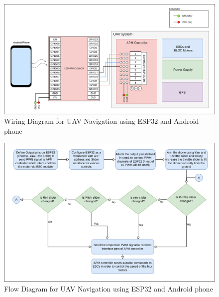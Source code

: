 \begin{figure}[h!]
\centering
\includegraphics[width=\columnwidth]{./Figures/Wiring_UAV_ESP32_commlink.png}
\caption{Wiring Diagram for UAV Navigation using ESP32 and Android phone}
\label{Wiring_UAV_ESP32_commlink}
\end{figure}

\begin{figure}[ht]
\centering
\includegraphics[width=14cm]{./Figures/Flow_UAV_ESP32_commlink.png}
\caption{Flow Diagram for UAV Navigation using ESP32 and Android phone}
\label{Flow_UAV_ESP32_commlink}
\end{figure}

\newpage
